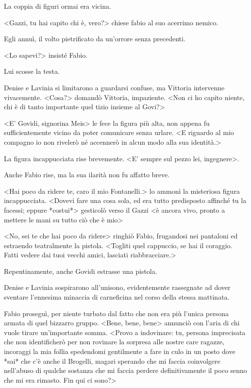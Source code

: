 La coppia di figuri ormai era vicina.

<Gazzi, tu hai capito chi è, vero?> chiese fabio al suo acerrimo nemico. 

Egli annuì, il volto pietrificato da un'orrore senza precedenti.

<Lo sapevi?> insisté Fabio.

Lui scosse la testa. 

Denise e Lavinia si limitarono a guardarsi confuse, ma Vittoria intervenne vivacemente. <Cosa?> domandò Vittoria, impaziente. <Non ci ho capito niente, chi è di tanto importante quel tizio insieme al Govi?>

<E' Govidi, signorina Meis> le fece la figura più alta, non appena fu sufficientemente vicino da poter comunicare senza urlare. <E riguardo al mio compagno io non rivelerò né accennerò in alcun modo alla sua identità.>

La figura incappucciata rise brevemente. <E' sempre sul pezzo lei, ingegnere>.

Anche Fabio rise, ma la sua ilarità non fu affatto breve.

<Hai poco da ridere te, caro il mio Fontanelli.> lo ammonì la misteriosa figura incappucciata. <Dovevi fare una cosa sola, ed era tutto predisposto affinché tu la facessi; eppure *costui*> gesticolò verso il Gazzi <è ancora vivo, pronto a mettere le mani su tutto ciò che è mio>

<No, sei te che hai poco da ridere> ringhiò Fabio, frugandosi nei pantaloni ed estraendo teatralmente la pistola. <Togliti quel cappuccio, se hai il coraggio. Fatti vedere dai tuoi vecchi amici, lasciati riabbracciare.>

Repentinamente, anche Govidi estrasse una pistola.

Denise e Lavinia sospirarono all'unisono, evidentemente rassegnate ad dover sventare l'ennesima minaccia di carneficina nel corso della stessa mattinata.

Fabio proseguì, per niente turbato dal fatto che non era più l'unica persona armata di quel bizzarro gruppo. <Bene, bene, bene> annunciò con l'aria di chi vuole tirare un'importante somma. <Provo a indovinare: tu, persona imprecisata che non identificherò per non rovinare la sorpresa alle nostre care ragazze, incoraggi la mia follia spedendomi gentilmente a fare in culo in un posto dove *sai* che c'è anche il Brogelli, magari sperando che mi faccia coinvolgere nell'abuso di qualche sostanza che mi faccia perdere definitivamente il poco senno che mi era rimasto. Fin qui ci sono?>

